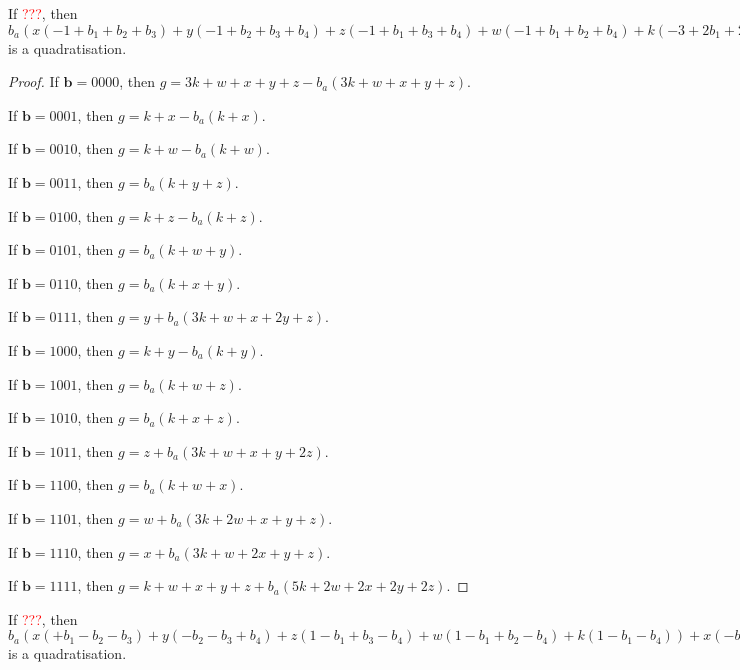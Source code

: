 \documentclass[11pt]{scrartcl}
\newcommand{\vc}[1]{\boldsymbol{#1}}
\begin{document}
\begin{lemma}
 If \textcolor{red}{???}, then $b_a(x(-1+b_1+b_2+b_3)+y(-1+b_2+b_3+b_4)+z(-1+b_1+b_3+b_4)+w(-1+b_1+b_2+b_4)+k(-3+2b_1+2b_2+2b_3+2b_4))+x(+1 -b_1-b_2-b_3+b_1b_2+b_1b_3+b_2b_3)+y(+1 -b_2-b_3-b_4+b_2b_3+b_2b_4+b_3b_4)+z(+1 -b_1-b_3-b_4+b_1b_3+b_1b_4+b_3b_4)+w(+1 -b_1-b_2-b_4+b_1b_2+b_1b_4+b_2b_4)+k(+3 -2 b_1-2 b_2-2 b_3-2 b_4+b_1b_2+b_1b_3+b_1b_4+b_2b_3+b_2b_4+b_3b_4)$ is a quadratisation.\\
 \end{lemma}

\begin{proof}
If $\vc b = 0000$, then $g = 3k + w + x + y + z - b_a(3k + w + x + y + z)$.

If $\vc b = 0001$, then $g = k + x - b_a(k + x)$.

If $\vc b = 0010$, then $g = k + w - b_a(k + w)$.

If $\vc b = 0011$, then $g = b_a(k + y + z)$.

If $\vc b = 0100$, then $g = k + z - b_a(k + z)$.

If $\vc b = 0101$, then $g = b_a(k + w + y)$.

If $\vc b = 0110$, then $g = b_a(k + x + y)$.

If $\vc b = 0111$, then $g = y + b_a(3k + w + x + 2y + z)$.

If $\vc b = 1000$, then $g = k + y - b_a(k + y)$.

If $\vc b = 1001$, then $g = b_a(k + w + z)$.

If $\vc b = 1010$, then $g = b_a(k + x + z)$.

If $\vc b = 1011$, then $g = z + b_a(3k + w + x + y + 2z)$.

If $\vc b = 1100$, then $g = b_a(k + w + x)$.

If $\vc b = 1101$, then $g = w + b_a(3k + 2w + x + y + z)$.

If $\vc b = 1110$, then $g = x + b_a(3k + w + 2x + y + z)$.

If $\vc b = 1111$, then $g = k + w + x + y + z + b_a(5k + 2w + 2x + 2y + 2z)$.

\end{proof}

\begin{lemma}
 If \textcolor{red}{???}, then $b_a(x(+b_1-b_2-b_3)+y(-b_2-b_3+b_4)+z(1-b_1+b_3-b_4)+w(1-b_1+b_2-b_4)+k(1-b_1-b_4))+x(-b_1+b_1b_2+b_1b_3)+y(-b_4+b_2b_4+b_3b_4)+z(+b_1b_4)+w(+b_1b_4)+k(+b_1b_4)$ is a quadratisation.\\
 \end{lemma}
\end{document}
